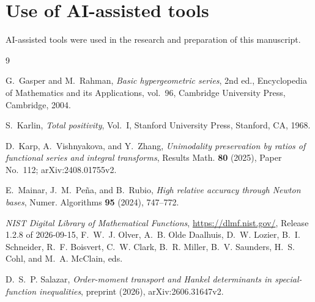 \documentclass{amsart}
\theoremstyle{remark}
\numberwithin{equation}{section}
\begin{document}
\section*{Use of AI-assisted tools}
AI-assisted tools were used in the research and preparation of this manuscript.

\begin{thebibliography}{9}

G.~Gasper and M.~Rahman, \emph{Basic hypergeometric series}, 2nd ed., Encyclopedia of Mathematics and its Applications, vol.~96, Cambridge University Press, Cambridge, 2004.

S.~Karlin, \emph{Total positivity}, Vol.~I, Stanford University Press, Stanford, CA, 1968.

D.~Karp, A.~Vishnyakova, and Y.~Zhang, \emph{Unimodality preservation by ratios of functional series and integral transforms}, Results Math. \textbf{80} (2025), Paper No.~112; arXiv:2408.01755v2.

E.~Mainar, J.~M.~Pe\~na, and B.~Rubio, \emph{High relative accuracy through Newton bases}, Numer. Algorithms \textbf{95} (2024), 747--772.

\emph{NIST Digital Library of Mathematical Functions}, \url{https://dlmf.nist.gov/}, Release 1.2.8 of 2026-09-15, F.~W.~J. Olver, A.~B. Olde Daalhuis, D.~W. Lozier, B.~I. Schneider, R.~F. Boisvert, C.~W. Clark, B.~R. Miller, B.~V. Saunders, H.~S. Cohl, and M.~A. McClain, eds.

D.~S.~P. Salazar, \emph{Order-moment transport and Hankel determinants in special-function inequalities}, preprint (2026), arXiv:2606.31647v2.

\end{thebibliography}
\end{document}
